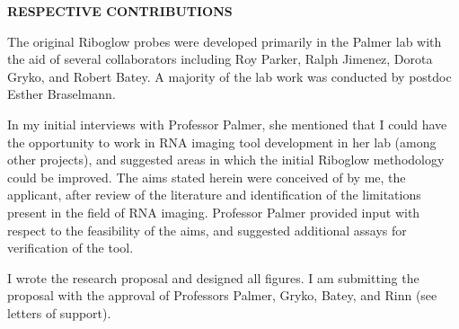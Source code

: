 \documentclass{F32}
\begin{document}
\begin{center}
{\bf RESPECTIVE CONTRIBUTIONS}
\end{center}

The original Riboglow probes were developed primarily in the Palmer lab with the aid of several collaborators including Roy Parker, Ralph Jimenez, Dorota Gryko, and Robert Batey. A majority of the lab work was conducted by postdoc Esther Braselmann.

In my initial interviews with Professor Palmer, she mentioned that I could have the opportunity to work in RNA imaging tool development in her lab (among other projects), and suggested areas in which the initial Riboglow methodology could be improved. The aims stated herein were conceived of by me, the applicant, after review of the literature and identification of the limitations present in the field of RNA imaging. Professor Palmer provided input with respect to the feasibility of the aims, and suggested additional assays for verification of the tool.

I wrote the research proposal and designed all figures. I am submitting the proposal with the approval of Professors Palmer, Gryko, Batey, and Rinn (see letters of support).
\end{document}
